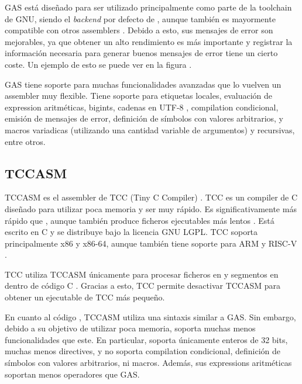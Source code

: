 \gls{GAS} está diseñado para ser utilizado principalmente como parte de la
\gls{toolchain} de GNU, siendo el \textit{backend} por defecto de ,
aunque también es mayormente compatible con otros \glspl{assembler}
\parencite{as-manual}. Debido a esto, sus mensajes de error son mejorables, ya
que obtener un alto rendimiento es más importante y registrar la información
necesaria para generar buenos mensajes de error tiene un cierto coste. Un
ejemplo de esto se puede ver en la figura .


\gls{GAS} tiene soporte para muchas funcionalidades avanzadas que lo vuelven un
\gls{assembler} muy flexible. Tiene soporte para etiquetas locales, evaluación
de \gls{expression} aritméticas, \glspl{bigint}, cadenas en UTF-8
\parencite{UTF-8}, \gls{compilation} condicional, emisión de mensajes de error,
definición de símbolos con valores arbitrarios, y \glspl{macro} variadicas
(utilizando una cantidad variable de argumentos) y recursivas, entre otros.

\subsection{TCCASM}

TCCASM es el \gls{assembler} de TCC (Tiny C Compiler) \parencite{tcc}. TCC es un
\gls{compiler} de C diseñado para utilizar poca memoria y ser muy rápido. Es
significativamente más rápido  que
, aunque también produce ficheros ejecutables más lentos
\parencite{tcc-speed}. Está escrito en C y se distribuye bajo la licencia GNU
LGPL. TCC soporta principalmente x86 y x86-64, aunque también tiene soporte para
ARM y RISC-V \parencite{tcc-manual} \parencite{tcc-arm} \parencite{tcc-riscv}.

TCC utiliza TCCASM únicamente para procesar ficheros en
 y segmentos en 
dentro de código C \parencite{tcc-manual}. Gracias a esto, TCC permite
desactivar TCCASM para obtener un ejecutable de TCC más pequeño.

En cuanto al código , TCCASM utiliza una sintaxis
similar a \gls{GAS}. Sin embargo, debido a su objetivo de utilizar poca memoria,
soporta muchas menos funcionalidades que este. En particular, soporta únicamente
enteros de 32 bits, muchas menos \glspl{directive}, y no soporta
\gls{compilation} condicional, definición de símbolos con valores arbitrarios,
ni \glspl{macro}. Además, sus \glspl{expression} aritméticas soportan menos
operadores que \gls{GAS}.

